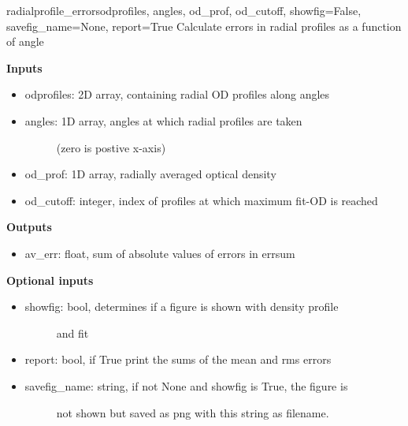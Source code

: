 \documentclass[letterpaper,10pt,english]{manual}
\begin{document}

\hypertarget{imageprocess.radialprofile_errors}{}\begin{funcdesc}{radialprofile\_errors}{odprofiles, angles, od\_prof, od\_cutoff, showfig=False, savefig\_name=None, report=True}
Calculate errors in radial profiles as a function of angle

\textbf{Inputs}
\begin{itemize}
\item {} 
odprofiles: 2D array, containing radial OD profiles along angles

\item {} \begin{description}
\item[angles: 1D array, angles at which radial profiles are taken]
(zero is postive x-axis)

\end{description}

\item {} 
od\_prof: 1D array, radially averaged optical density

\item {} 
od\_cutoff: integer, index of profiles at which maximum fit-OD is reached

\end{itemize}

\textbf{Outputs}
\begin{itemize}
\item {} 
av\_err: float, sum of absolute values of errors in errsum

\end{itemize}

\textbf{Optional inputs}
\begin{itemize}
\item {} \begin{description}
\item[showfig: bool, determines if a figure is shown with density profile]
and fit

\end{description}

\item {} 
report: bool, if True print the sums of the mean and rms errors

\item {} \begin{description}
\item[savefig\_name: string, if not None and showfig is True, the figure is]
not shown but saved as png with this string as filename.

\end{description}

\end{itemize}
\end{funcdesc}
\end{document}
